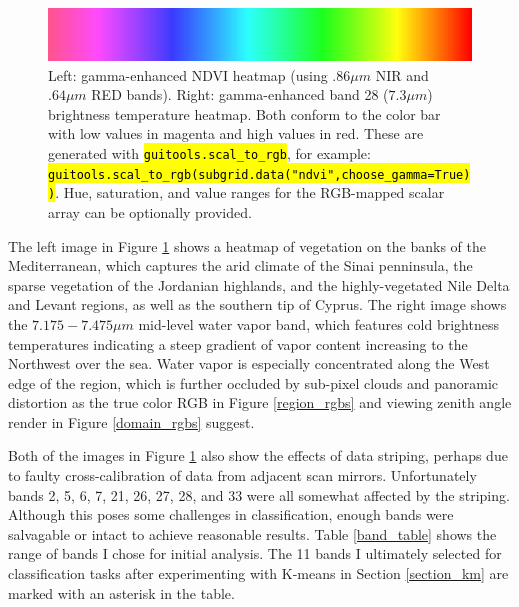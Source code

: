 \documentclass[12pt]{article}
\newcommand{\hltexttt}[1]{\texttt{\hl{#1}}}
\begin{document}
\begin{figure}[h!]
    \includegraphics[width=.3\paperwidth]{figs/hsv/cbar.png}

    \caption{Left: gamma-enhanced NDVI heatmap (using $.86\mu m$ NIR and $.64\mu m$ RED bands). Right: gamma-enhanced band 28 ($7.3\mu m$) brightness temperature heatmap. Both conform to the color bar with low values in magenta and high values in red. These are generated with \hltexttt{guitools.scal\_to\_rgb}, for example: \hltexttt{guitools.scal\_to\_rgb(subgrid.data("ndvi",choose\_gamma=True))}. Hue, saturation, and value ranges for the RGB-mapped scalar array can be optionally provided.}
    \label{hsv_ndvi_28}
\end{figure}

The left image in Figure \ref{hsv_ndvi_28} shows a heatmap of vegetation on the banks of the Mediterranean, which captures the arid climate of the Sinai penninsula, the sparse vegetation of the Jordanian highlands, and the highly-vegetated Nile Delta and Levant regions, as well as the southern tip of Cyprus. The right image shows the $7.175-7.475\mu m$ mid-level water vapor band, which features cold brightness temperatures indicating a steep gradient of vapor content increasing to the Northwest over the sea. Water vapor is especially concentrated along the West edge of the region, which is further occluded by sub-pixel clouds and panoramic distortion as the true color RGB in Figure \ref{region_rgbs} and viewing zenith angle render in Figure \ref{domain_rgbs} suggest.

Both of the images in Figure \ref{hsv_ndvi_28} also show the effects of data striping, perhaps due to faulty cross-calibration of data from adjacent scan mirrors. Unfortunately bands 2, 5, 6, 7, 21, 26, 27, 28, and 33 were all somewhat affected by the striping. Although this poses some challenges in classification, enough bands were salvagable or intact to achieve reasonable results. Table \ref{band_table} shows the range of bands I chose for initial analysis. The 11 bands I ultimately selected for classification tasks after experimenting with K-means in Section \ref{section_km} are marked with an asterisk in the table.
\end{document}
